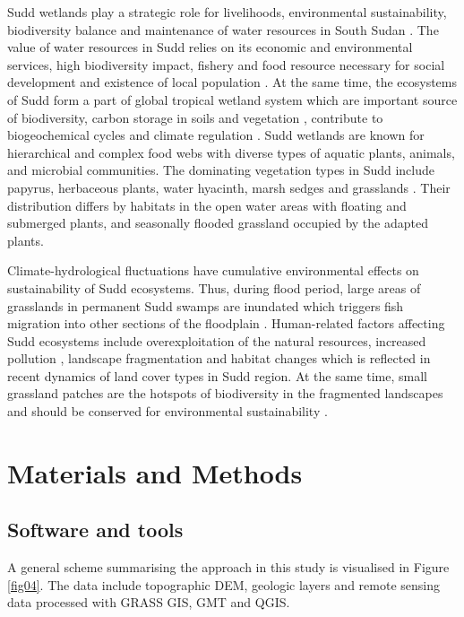 \documentclass[analytics,article,submit,pdftex,moreauthors]{Definitions/mdpi}
\begin{document}
Sudd wetlands play a strategic role for livelihoods, environmental sustainability, biodiversity balance and maintenance of water resources in South Sudan \cite{Benansio}. The value of water resources in Sudd relies on its economic and environmental services, high biodiversity impact, fishery and food resource \cite{Bailey} necessary for social development and existence of local population \cite{assessment2005ecosystems}. At the same time, the ecosystems of Sudd form a part of global tropical wetland system which are important source of biodiversity, carbon storage in soils and vegetation \cite{Thompson}, contribute to biogeochemical cycles and climate regulation \cite{Fynn}. Sudd wetlands are known for hierarchical and complex food webs with diverse types of aquatic plants, animals, and microbial communities. The dominating vegetation types in Sudd include papyrus, herbaceous plants, water hyacinth, marsh sedges and grasslands \cite{PACINI2018142}. Their distribution differs by habitats in the open water areas with floating and submerged plants, and seasonally flooded grassland occupied by the adapted plants. 

Climate-hydrological fluctuations have cumulative environmental effects on sustainability of Sudd ecosystems. Thus, during flood period, large areas of grasslands in permanent Sudd swamps are inundated which triggers fish migration into other sections of the floodplain \cite{Hickley}. Human-related factors affecting Sudd ecosystems include overexploitation of the natural resources, increased pollution \cite{LOW2021113424}, landscape fragmentation \cite{Collins} and habitat changes \cite{NAGENDRA201345} which is reflected in recent dynamics of land cover types in Sudd region. At the same time, small grassland patches are the hotspots of biodiversity in the fragmented landscapes and should be conserved for environmental sustainability \cite{YAN2021108086}. 

\section{Materials and Methods}

\subsection{Software and tools}
A general scheme summarising the approach in this study is visualised in Figure \ref{fig04}. The data include topographic DEM, geologic layers and remote sensing data processed with GRASS GIS, GMT and QGIS.
\end{document}
